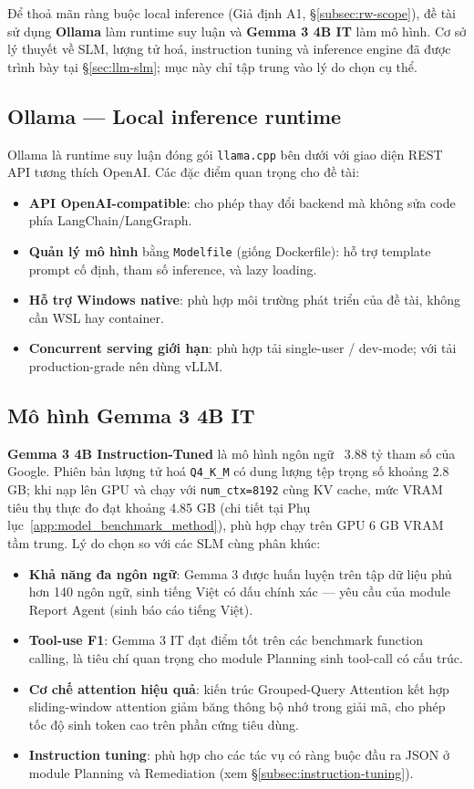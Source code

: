 Để thoả mãn ràng buộc local inference (Giả định A1, §\ref{subsec:rw-scope}), đề tài sử dụng \textbf{Ollama} làm runtime suy luận và \textbf{Gemma 3 4B IT} làm mô hình. Cơ sở lý thuyết về SLM, lượng tử hoá, instruction tuning và inference engine đã được trình bày tại §\ref{sec:llm-slm}; mục này chỉ tập trung vào lý do chọn cụ thể.

\subsection{Ollama --- Local inference runtime}
\label{subsec:ollama-tool}

Ollama \cite{ollama2024} là runtime suy luận đóng gói \texttt{llama.cpp} bên dưới với giao diện REST API tương thích OpenAI. Các đặc điểm quan trọng cho đề tài:
\begin{itemize}
  \item \textbf{API OpenAI-compatible}: cho phép thay đổi backend mà không sửa code phía LangChain/LangGraph.
  \item \textbf{Quản lý mô hình} bằng \texttt{Modelfile} (giống Dockerfile): hỗ trợ template prompt cố định, tham số inference, và lazy loading.
  \item \textbf{Hỗ trợ Windows native}: phù hợp môi trường phát triển của đề tài, không cần WSL hay container.
  \item \textbf{Concurrent serving giới hạn}: phù hợp tải single-user / dev-mode; với tải production-grade nên dùng vLLM.
\end{itemize}

\subsection{Mô hình Gemma 3 4B IT}
\label{subsec:gemma-tool}

\textbf{Gemma 3 4B Instruction-Tuned} \cite{google2025gemma3} là mô hình ngôn ngữ ~3.88 tỷ tham số của Google. Phiên bản lượng tử hoá \texttt{Q4\_K\_M} có dung lượng tệp trọng số khoảng 2.8 GB; khi nạp lên GPU và chạy với \texttt{num\_ctx=8192} cùng KV cache, mức VRAM tiêu thụ thực đo đạt khoảng 4.85 GB (chi tiết tại Phụ lục~\ref{app:model_benchmark_method}), phù hợp chạy trên GPU 6 GB VRAM tầm trung. Lý do chọn so với các SLM cùng phân khúc:
\begin{itemize}
  \item \textbf{Khả năng đa ngôn ngữ}: Gemma 3 được huấn luyện trên tập dữ liệu phủ hơn 140 ngôn ngữ, sinh tiếng Việt có dấu chính xác --- yêu cầu của module Report Agent (sinh báo cáo tiếng Việt).
  \item \textbf{Tool-use F1}: Gemma 3 IT đạt điểm tốt trên các benchmark function calling, là tiêu chí quan trọng cho module Planning sinh tool-call có cấu trúc.
  \item \textbf{Cơ chế attention hiệu quả}: kiến trúc Grouped-Query Attention kết hợp sliding-window attention giảm băng thông bộ nhớ trong giải mã, cho phép tốc độ sinh token cao trên phần cứng tiêu dùng.
  \item \textbf{Instruction tuning}: phù hợp cho các tác vụ có ràng buộc đầu ra JSON ở module Planning và Remediation (xem §\ref{subsec:instruction-tuning}).
\end{itemize}

